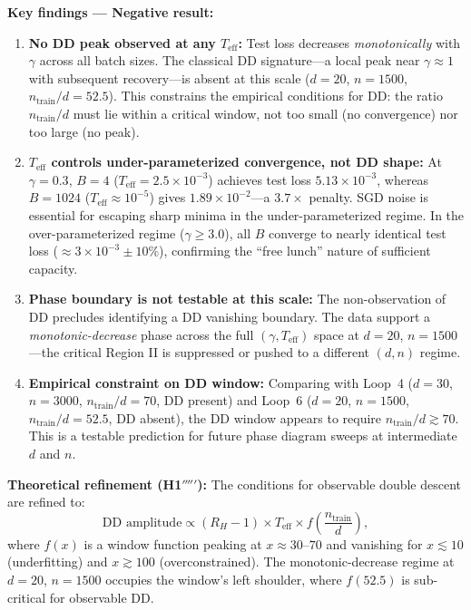 \documentclass[
  journal=largetwo,
  simfonts=false,
  year=2025,
  volume=37,
]{cup-journal}
\begin{document}
\textbf{Key findings --- Negative result:}
\begin{enumerate}
    \item \textbf{No DD peak observed at any $T_{\mathrm{eff}}$:} Test loss decreases \emph{monotonically} with $\gamma$ across all batch sizes. The classical DD signature---a local peak near $\gamma \approx 1$ with subsequent recovery---is absent at this scale ($d=20$, $n=1500$, $n_{\mathrm{train}}/d = 52.5$). This constrains the empirical conditions for DD: the ratio $n_{\mathrm{train}}/d$ must lie within a critical window, not too small (no convergence) nor too large (no peak).
    
    \item \textbf{$T_{\mathrm{eff}}$ controls under-parameterized convergence, not DD shape:} At $\gamma=0.3$, $B=4$ ($T_{\mathrm{eff}}=2.5\times 10^{-3}$) achieves test loss $5.13\times 10^{-3}$, whereas $B=1024$ ($T_{\mathrm{eff}}\approx 10^{-5}$) gives $1.89\times 10^{-2}$---a $3.7\times$ penalty. SGD noise is essential for escaping sharp minima in the under-parameterized regime. In the over-parameterized regime ($\gamma \geq 3.0$), all $B$ converge to nearly identical test loss ($\approx 3\times 10^{-3} \pm 10\%$), confirming the ``free lunch'' nature of sufficient capacity.
    
    \item \textbf{Phase boundary is not testable at this scale:} The non-observation of DD precludes identifying a DD vanishing boundary. The data support a \emph{monotonic-decrease} phase across the full $(\gamma, T_{\mathrm{eff}})$ space at $d=20$, $n=1500$---the critical Region II is suppressed or pushed to a different $(d,n)$ regime.
    
    \item \textbf{Empirical constraint on DD window:} Comparing with Loop~4 ($d=30$, $n=3000$, $n_{\mathrm{train}}/d=70$, DD present) and Loop~6 ($d=20$, $n=1500$, $n_{\mathrm{train}}/d=52.5$, DD absent), the DD window appears to require $n_{\mathrm{train}}/d \gtrsim 70$. This is a testable prediction for future phase diagram sweeps at intermediate $d$ and $n$.
\end{enumerate}

\textbf{Theoretical refinement (H1$'''''$):} The conditions for observable double descent are refined to:
\[
\text{DD amplitude} \propto (R_H - 1) \times T_{\mathrm{eff}} \times f\!\left(\frac{n_{\mathrm{train}}}{d}\right),
\]
where $f(x)$ is a window function peaking at $x \approx 30$--$70$ and vanishing for $x \lesssim 10$ (underfitting) and $x \gtrsim 100$ (overconstrained). The monotonic-decrease regime at $d=20$, $n=1500$ occupies the window's left shoulder, where $f(52.5)$ is sub-critical for observable DD.
\end{document}
